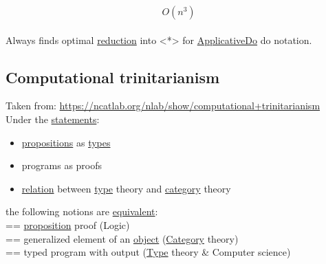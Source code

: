 \documentclass[11pt]{article}
\begin{document}
$$ O(n^3) $$\\
Always finds optimal \hyperref[org7bec118]{reduction} into <*> for \hyperref[org55db24e]{ApplicativeDo} do notation.\\

\subsection{\label{org1493307}Computational trinitarianism}
\label{sec:orgcd874d5}

Taken from: \url{https://ncatlab.org/nlab/show/computational+trinitarianism}\\

Under the \hyperref[org0c99cef]{statements}:\\

\begin{itemize}
\item \hyperref[org6498988]{propositions} as \hyperref[org4209edd]{types}\\

\item programs as proofs\\

\item \hyperref[orga5705a9]{relation} between \hyperref[orgc4aea2f]{type} theory and \hyperref[org0450535]{category} theory\\
\end{itemize}

the following notions are \hyperref[orgff529d7]{equivalent}:\\

== \hyperref[org1e068ed]{proposition} proof (Logic)\\

== generalized element of an \hyperref[org4be0e9d]{object} (\hyperref[org0450535]{Category} theory)\\

== typed program with output (\hyperref[orgc4aea2f]{Type} theory \& Computer science)\\
\end{document}
